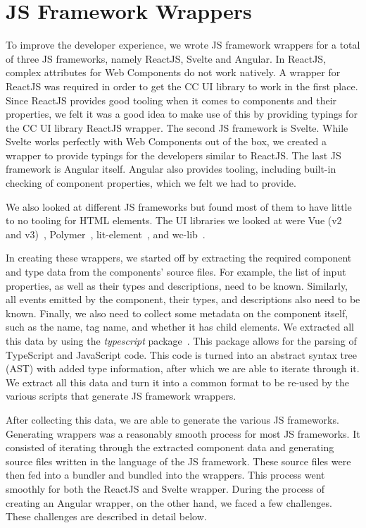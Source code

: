 \section{JS Framework Wrappers}\label{sec:js-framework-wrappers}
To improve the developer experience, we wrote JS framework wrappers for a total of three JS frameworks, namely ReactJS, Svelte and Angular. In ReactJS, complex attributes for Web Components do not work natively. A wrapper for ReactJS was required in order to get the CC UI library to work in the first place. Since ReactJS provides good tooling when it comes to components and their properties, we felt it was a good idea to make use of this by providing typings for the CC UI library ReactJS wrapper. The second JS framework is Svelte. While Svelte works perfectly with Web Components out of the box, we created a wrapper to provide typings for the developers similar to ReactJS. The last JS framework is Angular itself. Angular also provides tooling, including built-in checking of component properties, which we felt we had to provide.

We also looked at different JS frameworks but found most of them to have little to no tooling for HTML elements. The UI libraries we looked at were Vue (v2 and v3)~, Polymer~, lit-element~, and wc-lib~.

In creating these wrappers, we started off by extracting the required component and type data from the components' source files. For example, the list of input properties, as well as their types and descriptions, need to be known. Similarly, all events emitted by the component, their types, and descriptions also need to be known. Finally, we also need to collect some metadata on the component itself, such as the name, tag name, and whether it has child elements. We extracted all this data by using the \emph{typescript} package~. This package allows for the parsing of TypeScript and JavaScript code. This code is turned into an abstract syntax tree (AST) with added type information, after which we are able to iterate through it. We extract all this data and turn it into a common format to be re-used by the various scripts that generate JS framework wrappers.

After collecting this data, we are able to generate the various JS frameworks. Generating wrappers was a reasonably smooth process for most JS frameworks. It consisted of iterating through the extracted component data and generating source files written in the language of the JS framework. These source files were then fed into a bundler and bundled into the wrappers. This process went smoothly for both the ReactJS and Svelte wrapper. During the process of creating an Angular wrapper, on the other hand, we faced a few challenges. These challenges are described in detail below.

